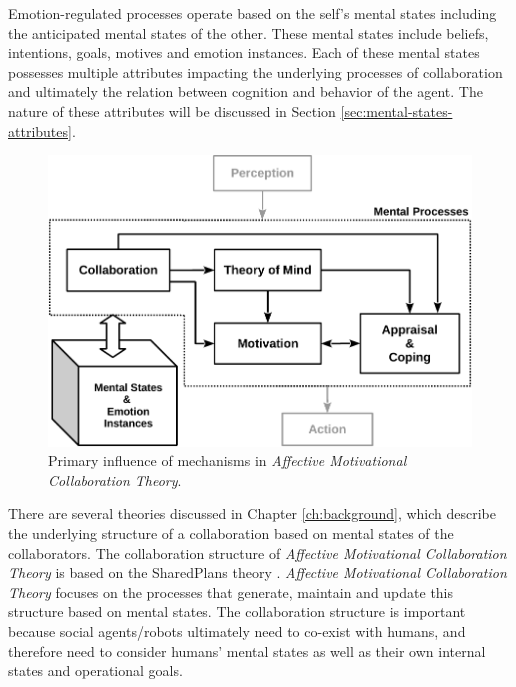 \documentclass[12pt]{report}
\begin{document}
Emotion-regulated processes operate based on the self's mental states including
the anticipated mental states of the other. These mental states include beliefs,
intentions, goals, motives and emotion instances. Each of these mental states
possesses multiple attributes impacting the underlying processes of
collaboration and ultimately the relation between cognition and behavior of the
agent. The nature of these attributes will be discussed in Section
\ref{sec:mental-states-attributes}.

\begin{figure}[h!] 
  \centering
  \includegraphics[scale=1]{figure/theory-general-croped.pdf}
  \caption{Primary influence of mechanisms in \textit{Affective Motivational
  Collaboration Theory}.}
  \label{fig:theory}
  \vspace*{-7mm}
\end{figure}

There are several theories discussed in Chapter \ref{ch:background}, which
describe the underlying structure of a collaboration based on mental states of
the collaborators. The collaboration structure of \textit{Affective Motivational
Collaboration Theory} is based on the SharedPlans theory
\cite{grosz:shared-plans}. \textit{Affective Motivational Collaboration Theory}
focuses on the processes that generate, maintain and update this structure
based on mental states. The collaboration structure is important because social
agents/robots ultimately need to co-exist with humans, and therefore need to
consider humans' mental states as well as their own internal states and
operational goals.
\end{document}
